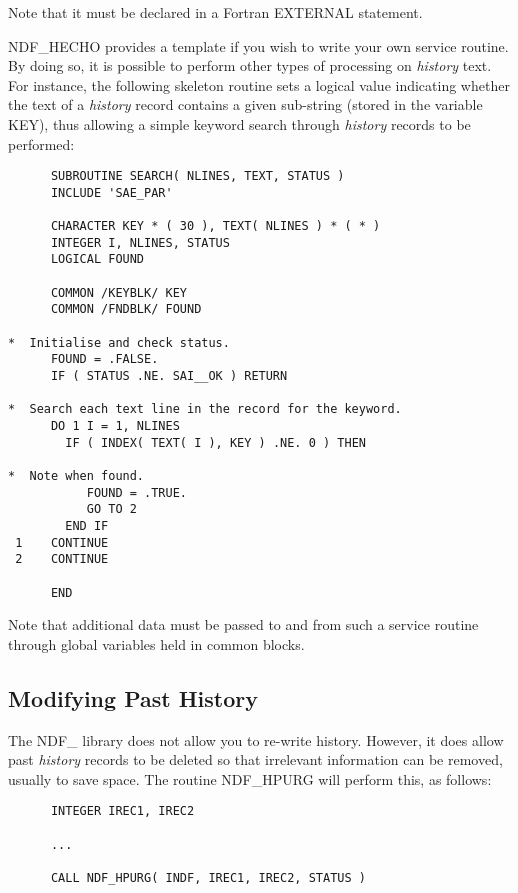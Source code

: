 \documentclass[twoside,11pt]{article}
\newcommand{\htmlref}[2]{#1}
\newcommand{\xlabel}[1]{}
\newcommand{\st}[1]{{\em{#1}}}
\begin{document}
Note that it must be declared in a Fortran EXTERNAL statement.

NDF\_HECHO provides a template if you wish to write your own service
routine. By doing so, it is possible to perform other types of
processing on \st{history\/} text. For instance, the following skeleton
routine sets a logical value indicating whether the text of a
\st{history\/} record contains a given sub-string (stored in the
variable 
KEY), thus allowing a simple keyword search through \st{history\/}
records to be performed:

\small
\begin{verbatim}
      SUBROUTINE SEARCH( NLINES, TEXT, STATUS )
      INCLUDE 'SAE_PAR'

      CHARACTER KEY * ( 30 ), TEXT( NLINES ) * ( * )
      INTEGER I, NLINES, STATUS
      LOGICAL FOUND

      COMMON /KEYBLK/ KEY
      COMMON /FNDBLK/ FOUND

*  Initialise and check status.
      FOUND = .FALSE.
      IF ( STATUS .NE. SAI__OK ) RETURN

*  Search each text line in the record for the keyword.
      DO 1 I = 1, NLINES
        IF ( INDEX( TEXT( I ), KEY ) .NE. 0 ) THEN

*  Note when found.
           FOUND = .TRUE.
           GO TO 2
        END IF
 1    CONTINUE
 2    CONTINUE

      END
\end{verbatim}
\normalsize

Note that additional data must be passed to and from such a service
routine through global variables held in common blocks.

\subsection{\xlabel{modifying_past_history}Modifying Past History}

The NDF\_ library does not allow you to re-write history. However, it
does allow past \st{history\/} records to be deleted so that irrelevant
information can be removed, usually to save space. The routine
\htmlref{NDF\_HPURG}{NDF_HPURG} will perform this, as follows:

\small
\begin{verbatim}
      INTEGER IREC1, IREC2

      ...

      CALL NDF_HPURG( INDF, IREC1, IREC2, STATUS )
\end{verbatim}
\normalsize
\end{document}
